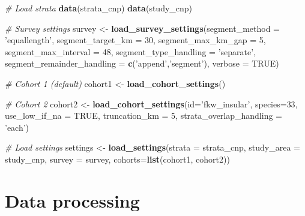 \documentclass[
]{book}
\newenvironment{Shaded}{\begin{snugshade}}{\end{snugshade}}
\newcommand{\CommentTok}[1]{\textcolor[rgb]{0.56,0.35,0.01}{\textit{#1}}}
\newcommand{\DataTypeTok}[1]{\textcolor[rgb]{0.13,0.29,0.53}{#1}}
\newcommand{\DecValTok}[1]{\textcolor[rgb]{0.00,0.00,0.81}{#1}}
\newcommand{\KeywordTok}[1]{\textcolor[rgb]{0.13,0.29,0.53}{\textbf{#1}}}
\newcommand{\NormalTok}[1]{#1}
\newcommand{\OtherTok}[1]{\textcolor[rgb]{0.56,0.35,0.01}{#1}}
\newcommand{\StringTok}[1]{\textcolor[rgb]{0.31,0.60,0.02}{#1}}
\begin{document}
\begin{Shaded}
\begin{Highlighting}[]
\CommentTok{# Load strata}
\KeywordTok{data}\NormalTok{(strata_cnp)}
\KeywordTok{data}\NormalTok{(study_cnp)}

\CommentTok{# Survey settings}
\NormalTok{survey <-}\StringTok{ }
\StringTok{  }\KeywordTok{load_survey_settings}\NormalTok{(}\DataTypeTok{segment_method =} \StringTok{'equallength'}\NormalTok{,}
                       \DataTypeTok{segment_target_km =} \DecValTok{30}\NormalTok{,}
                       \DataTypeTok{segment_max_km_gap =} \DecValTok{5}\NormalTok{,}
                       \DataTypeTok{segment_max_interval =} \DecValTok{48}\NormalTok{,}
                       \DataTypeTok{segment_type_handling =} \StringTok{'separate'}\NormalTok{,}
                       \DataTypeTok{segment_remainder_handling =} \KeywordTok{c}\NormalTok{(}\StringTok{'append'}\NormalTok{,}\StringTok{'segment'}\NormalTok{),}
                       \DataTypeTok{verbose =} \OtherTok{TRUE}\NormalTok{)}

\CommentTok{# Cohort 1 (default)}
\NormalTok{cohort1 <-}\StringTok{ }\KeywordTok{load_cohort_settings}\NormalTok{()}

\CommentTok{# Cohort 2}
\NormalTok{cohort2 <-}\StringTok{ }
\StringTok{  }\KeywordTok{load_cohort_settings}\NormalTok{(}\DataTypeTok{id=}\StringTok{'fkw_insular'}\NormalTok{,}
                       \DataTypeTok{species=}\DecValTok{33}\NormalTok{,}
                       \DataTypeTok{use_low_if_na =} \OtherTok{TRUE}\NormalTok{,}
                       \DataTypeTok{truncation_km =} \DecValTok{5}\NormalTok{,}
                       \DataTypeTok{strata_overlap_handling =} \StringTok{'each'}\NormalTok{)}

\CommentTok{# Load settings}
\NormalTok{settings <-}\StringTok{ }\KeywordTok{load_settings}\NormalTok{(}\DataTypeTok{strata =}\NormalTok{ strata_cnp,}
                          \DataTypeTok{study_area =}\NormalTok{ study_cnp,}
                          \DataTypeTok{survey =}\NormalTok{ survey,}
                          \DataTypeTok{cohorts=}\KeywordTok{list}\NormalTok{(cohort1,}
\NormalTok{                                       cohort2))}
\end{Highlighting}
\end{Shaded}

\hypertarget{processing}{%
\chapter{Data processing}\label{processing}}
\end{document}
